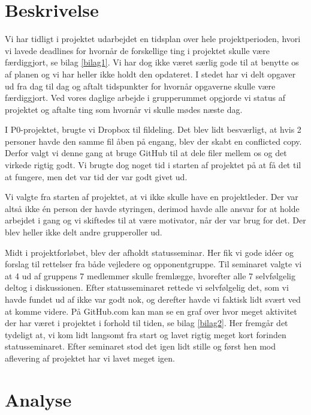 \section{Beskrivelse}
Vi har tidligt i projektet udarbejdet en tidsplan over hele projektperioden, hvori vi lavede deadlines for hvornår de forskellige ting i projektet skulle være færdiggjort, se bilag \ref{bilag1}. Vi har dog ikke været særlig gode til at benytte os af planen og vi har heller ikke holdt den opdateret. I stedet har vi delt opgaver ud fra dag til dag og aftalt tidspunkter for hvornår opgaverne skulle være færdiggjort. Ved vores daglige arbejde i grupperummet opgjorde vi status af projektet og aftalte ting som hvornår vi skulle mødes næste dag. 

I P0-projektet, brugte vi Dropbox til fildeling. Det blev lidt besværligt, at hvis 2 personer havde den samme fil åben på engang, blev der skabt en conflicted copy. Derfor valgt vi denne gang at bruge GitHub til at dele filer mellem os og det virkede rigtig godt. Vi brugte dog noget tid i starten af projektet på at få det til at fungere, men det var tid der var godt givet ud. 

Vi valgte fra starten af projektet, at vi ikke skulle have en projektleder. Der var altså ikke én person der havde styringen, derimod havde alle ansvar for at holde arbejdet i gang og vi skiftedes til at være motivator, når der var brug for det. Der blev heller ikke delt andre grupperoller ud.  

Midt i projektforløbet, blev der afholdt statusseminar. Her fik vi gode idéer og forslag til rettelser fra både vejledere og opponentgruppe. Til seminaret valgte vi at 4 ud af gruppens 7 medlemmer skulle fremlægge, hvorefter alle 7 selvfølgelig deltog i diskussionen. Efter statusseminaret rettede vi selvfølgelig det, som vi havde fundet ud af ikke var godt nok, og derefter havde vi faktisk lidt svært ved at komme videre. På GitHub.com kan man se en graf over hvor meget aktivitet der har været i projektet i forhold til tiden, se bilag \ref{bilag2}. Her fremgår det tydeligt at, vi kom lidt langsomt fra start og lavet rigtig meget kort forinden statusseminaret. Efter seminaret stod det igen lidt stille og først hen mod aflevering af projektet har vi lavet meget igen. 

\section{Analyse}

